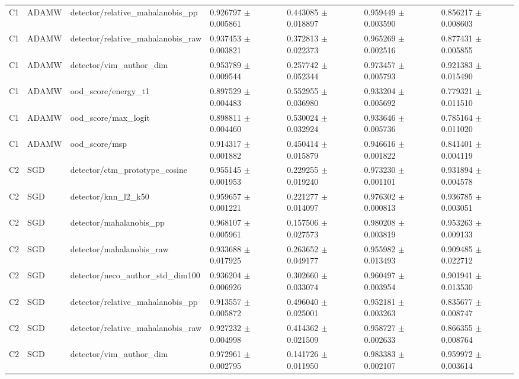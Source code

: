\begin{longtable}{lllllll}
C1 & ADAMW & detector/relative\_mahalanobis\_pp & 0.926797 $\pm$ 0.005861 & 0.443085 $\pm$ 0.018897 & 0.959449 $\pm$ 0.003590 & 0.856217 $\pm$ 0.008603 \\
C1 & ADAMW & detector/relative\_mahalanobis\_raw & 0.937453 $\pm$ 0.003821 & 0.372813 $\pm$ 0.022373 & 0.965269 $\pm$ 0.002516 & 0.877431 $\pm$ 0.005855 \\
C1 & ADAMW & detector/vim\_author\_dim & 0.953789 $\pm$ 0.009544 & 0.257742 $\pm$ 0.052344 & 0.973457 $\pm$ 0.005793 & 0.921383 $\pm$ 0.015490 \\
C1 & ADAMW & ood\_score/energy\_t1 & 0.897529 $\pm$ 0.004483 & 0.552955 $\pm$ 0.036980 & 0.933204 $\pm$ 0.005692 & 0.779321 $\pm$ 0.011510 \\
C1 & ADAMW & ood\_score/max\_logit & 0.898811 $\pm$ 0.004460 & 0.530024 $\pm$ 0.032924 & 0.933646 $\pm$ 0.005736 & 0.785164 $\pm$ 0.011020 \\
C1 & ADAMW & ood\_score/msp & 0.914317 $\pm$ 0.001882 & 0.450414 $\pm$ 0.015879 & 0.946616 $\pm$ 0.001822 & 0.841401 $\pm$ 0.004119 \\
C2 & SGD & detector/ctm\_prototype\_cosine & 0.955145 $\pm$ 0.001953 & 0.229255 $\pm$ 0.019240 & 0.973230 $\pm$ 0.001101 & 0.931894 $\pm$ 0.004578 \\
C2 & SGD & detector/knn\_l2\_k50 & 0.959657 $\pm$ 0.001221 & 0.221277 $\pm$ 0.014097 & 0.976302 $\pm$ 0.000813 & 0.936785 $\pm$ 0.003051 \\
C2 & SGD & detector/mahalanobis\_pp & 0.968107 $\pm$ 0.005961 & 0.157506 $\pm$ 0.027573 & 0.980208 $\pm$ 0.003819 & 0.953263 $\pm$ 0.009133 \\
C2 & SGD & detector/mahalanobis\_raw & 0.933688 $\pm$ 0.017925 & 0.263652 $\pm$ 0.049177 & 0.955982 $\pm$ 0.013493 & 0.909485 $\pm$ 0.022712 \\
C2 & SGD & detector/neco\_author\_std\_dim100 & 0.936204 $\pm$ 0.006926 & 0.302660 $\pm$ 0.033074 & 0.960497 $\pm$ 0.003954 & 0.901941 $\pm$ 0.013530 \\
C2 & SGD & detector/relative\_mahalanobis\_pp & 0.913557 $\pm$ 0.005872 & 0.496040 $\pm$ 0.025001 & 0.952181 $\pm$ 0.003263 & 0.835677 $\pm$ 0.008747 \\
C2 & SGD & detector/relative\_mahalanobis\_raw & 0.927232 $\pm$ 0.004998 & 0.414362 $\pm$ 0.021509 & 0.958727 $\pm$ 0.002633 & 0.866355 $\pm$ 0.008764 \\
C2 & SGD & detector/vim\_author\_dim & 0.972961 $\pm$ 0.002795 & 0.141726 $\pm$ 0.011950 & 0.983383 $\pm$ 0.002107 & 0.959972 $\pm$ 0.003614 \\

\end{longtable}
